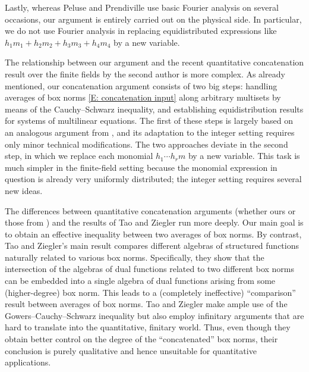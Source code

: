 \documentclass[11pt]{amsart}
\theoremstyle{definition}
\begin{document}
Lastly, whereas Peluse and Prendiville use basic Fourier analysis on several occasions, our argument is entirely carried out on the physical side. In particular, we do not use Fourier analysis in replacing equidistributed expressions like $h_1 m_1 + h_2 m_2 + h_3 m_3 + h_4 m_4$ by a new variable.

The relationship between our argument and the recent quantitative concatenation result over the finite fields by the second author \cite{Kuc23} is more complex. As already mentioned, our concatenation argument consists of two big steps: handling averages of box norms \eqref{E: concatenation input} along arbitrary multisets by means of the Cauchy--Schwarz inequality, and establishing equidistribution results for systems of multilinear equations. The first of these steps is largely based on an analogous argument from \cite{Kuc23}, and its adaptation to the integer setting requires only minor technical modifications. The two approaches deviate in the second step, in which we replace each monomial $h_1 \cdots h_r m$ by a new variable.  This task is much simpler in the finite-field setting because the  monomial expression in question is already very uniformly distributed; the integer setting requires several new ideas.

The differences between quantitative concatenation arguments (whether ours or those from \cite{Kuc23, Pel19, PP20}) and the results of Tao and Ziegler \cite{TZ16} run more deeply. Our main goal is to obtain an effective inequality between two averages of box norms. By contrast, Tao and Ziegler's main result compares different algebras of structured functions naturally related to various box norms. Specifically, they show that the intersection of the algebras of dual functions related to two different box norms can be embedded into a single algebra of dual functions arising from some (higher-degree) box norm.  This leads to a (completely ineffective) ``comparison'' result between averages of box norms.  Tao and Ziegler make ample use of the Gowers--Cauchy--Schwarz inequality but also employ infinitary arguments that are hard to translate into the quantitative, finitary world.
Thus, even though they obtain better control on the degree of the ``concatenated'' box norms, their conclusion is purely qualitative and hence unsuitable for quantitative applications.
\end{document}
